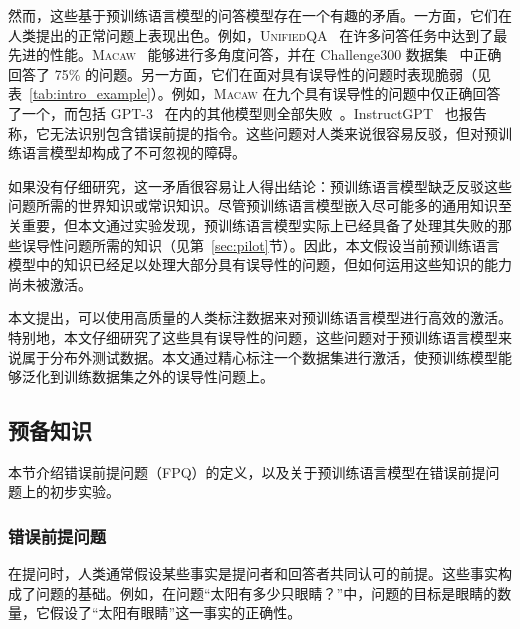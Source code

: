 然而，这些基于预训练语言模型的问答模型存在一个有趣的矛盾。一方面，它们在人类提出的正常问题上表现出色。例如，\textsc{UnifiedQA}~\cite{khashabi-etal-2020-unifiedqa} 在许多问答任务中达到了最先进的性能。\textsc{Macaw}~\cite{tafjord2021general} 能够进行多角度问答，并在 Challenge300 数据集~\cite{tafjord2021general} 中正确回答了 75\% 的问题。另一方面，它们在面对具有误导性的问题时表现脆弱（见表~\ref{tab:intro_example}）。例如，\textsc{Macaw} 在九个具有误导性的问题中仅正确回答了一个，而包括 GPT-3~\cite{brown2020language} 在内的其他模型则全部失败~\cite{tafjord2021general}。InstructGPT~\cite{ouyang2022training} 也报告称，它无法识别包含错误前提的指令。这些问题对人类来说很容易反驳，但对预训练语言模型却构成了不可忽视的障碍。

如果没有仔细研究，这一矛盾很容易让人得出结论：预训练语言模型缺乏反驳这些问题所需的世界知识或常识知识。尽管预训练语言模型嵌入尽可能多的通用知识至关重要，但本文通过实验发现，预训练语言模型实际上已经具备了处理其失败的那些误导性问题所需的知识（见第~\ref{sec:pilot}节）。因此，本文假设当前预训练语言模型中的知识已经足以处理大部分具有误导性的问题，但如何运用这些知识的能力尚未被激活。

本文提出，可以使用高质量的人类标注数据来对预训练语言模型进行高效的激活。特别地，本文仔细研究了这些具有误导性的问题，这些问题对于预训练语言模型来说属于分布外测试数据。本文通过精心标注一个数据集进行激活，使预训练模型能够泛化到训练数据集之外的误导性问题上。


\subsection{预备知识}
本节介绍错误前提问题（FPQ）的定义，以及关于预训练语言模型在错误前提问题上的初步实验。

\subsubsection{错误前提问题}
在提问时，人类通常假设某些事实是提问者和回答者共同认可的前提。这些事实构成了问题的基础。例如，在问题“太阳有多少只眼睛？”中，问题的目标是眼睛的数量，它假设了“太阳有眼睛”这一事实的正确性。

